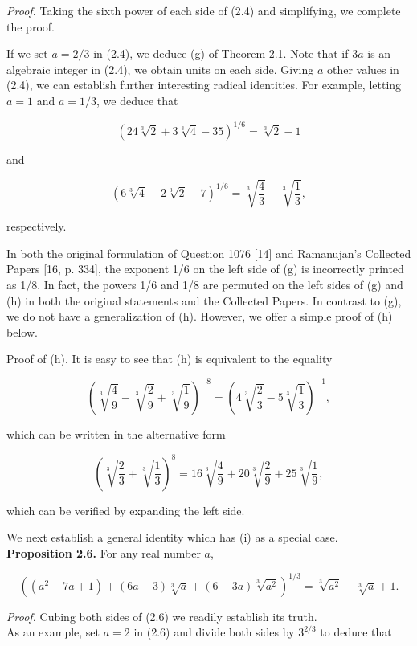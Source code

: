 \documentclass[11pt,letterpaper]{article}
\begin{document}
\noindent\textit{Proof.} Taking the sixth power of each side of (2.4) and simplifying, we complete the proof.

If we set $a=2 / 3$ in (2.4), we deduce (g) of Theorem 2.1. Note that if $3 a$ is an algebraic integer in (2.4), we obtain units on each side. Giving $a$ other values in (2.4), we can establish further interesting radical identities. For example, letting $a=1$ and $a=1 / 3$, we deduce that

\[
(24 \sqrt[3]{2}+3 \sqrt[3]{4}-35)^{1 / 6}=\sqrt[3]{2}-1
\]

and

\[
(6 \sqrt[3]{4}-2 \sqrt[3]{2}-7)^{1 / 6}=\sqrt[3]{\frac{4}{3}}-\sqrt[3]{\frac{1}{3}},
\]

respectively.


In both the original formulation of Question 1076 [14] and Ramanujan's Collected Papers [16, p. 334], the exponent 1/6 on the left side of (g) is incorrectly printed as 1/8. In fact, the powers 1/6 and 1/8 are permuted on the left sides of (g) and (h) in both the original statements and the Collected Papers. In contrast to (g), we do not have a generalization of (h). However, we offer a simple proof of (h) below.

Proof of (h). It is easy to see that (h) is equivalent to the equality

\[
\left(\sqrt[3]{\frac{4}{9}}-\sqrt[3]{\frac{2}{9}}+\sqrt[3]{\frac{1}{9}}\right)^{-8}=\left(4 \sqrt[3]{\frac{2}{3}}-5 \sqrt[3]{\frac{1}{3}}\right)^{-1},
\]

which can be written in the alternative form


\begin{equation*}
\left(\sqrt[3]{\frac{2}{3}}+\sqrt[3]{\frac{1}{3}}\right)^{8}=16 \sqrt[3]{\frac{4}{9}}+20 \sqrt[3]{\frac{2}{9}}+25 \sqrt[3]{\frac{1}{9}}, \tag{2.5}\label{eq:2.5}
\end{equation*}


which can be verified by expanding the left side.

We next establish a general identity which has (i) as a special case.\\
\noindent\textbf{Proposition 2.6.} For any real number $a$,


\begin{equation*}
\left(\left(a^{2}-7 a+1\right)+(6 a-3) \sqrt[3]{a}+(6-3 a) \sqrt[3]{a^{2}}\right)^{1 / 3}=\sqrt[3]{a^{2}}-\sqrt[3]{a}+1 . \tag{2.6}\label{eq:2.6}
\end{equation*}


\noindent\textit{Proof.} Cubing both sides of (2.6) we readily establish its truth.\\
As an example, set $a=2$ in (2.6) and divide both sides by $3^{2 / 3}$ to deduce that
\end{document}
